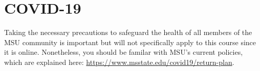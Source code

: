 
\section{COVID-19}

Taking the necessary precautions to safeguard the health of all members of the MSU community is important but will not specifically apply to this course since it is online. Nonetheless, you should be familar with MSU's current policies, which are explained here: \url{https://www.msstate.edu/covid19/return-plan}.



